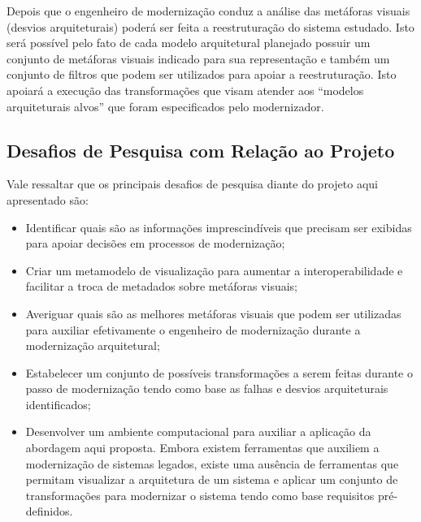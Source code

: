 \documentclass[12pt]{article}
\begin{document}
Depois que o engenheiro de modernização conduz a análise das metáforas visuais (desvios arquiteturais) poderá ser feita a reestruturação do sistema estudado. Isto será possível pelo fato de cada modelo arquitetural planejado possuir um conjunto de metáforas visuais indicado para sua representação e também um conjunto de filtros que podem ser utilizados para apoiar a reestruturação. Isto apoiará a execução das transformações que visam atender aos ``modelos arquiteturais alvos'' que foram especificados pelo modernizador. %


\subsection{Desafios de Pesquisa com Relação ao Projeto}

Vale ressaltar que os principais desafios de pesquisa diante do projeto aqui apresentado são:

\begin{itemize}
\item Identificar quais são as informações imprescindíveis que precisam ser exibidas para apoiar decisões em processos de modernização;
\item Criar um metamodelo de visualização para aumentar a interoperabilidade e facilitar a troca de metadados sobre metáforas visuais;
\item Averiguar quais são as melhores metáforas visuais que podem ser utilizadas para auxiliar efetivamente o engenheiro de modernização durante a modernização arquitetural; 
\item Estabelecer um conjunto de possíveis transformações a serem feitas durante o passo de modernização tendo como base as falhas e desvios arquiteturais identificados;
\item Desenvolver um ambiente computacional para auxiliar a aplicação da abordagem aqui proposta. Embora existem ferramentas que auxiliem a modernização de sistemas legados, existe uma ausência de ferramentas que permitam visualizar a arquitetura de um sistema e aplicar um conjunto de transformações para modernizar o sistema tendo como base requisitos pré-definidos.

\end{itemize}
\end{document}

